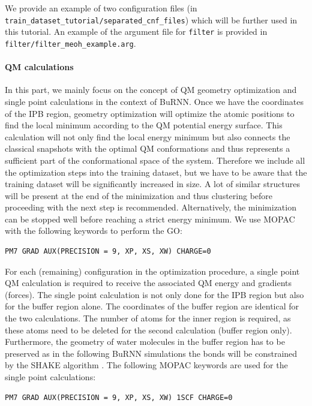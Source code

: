 We provide an example of two configuration files (in \texttt{train\_dataset\_tutorial/separated\_cnf\_files}) which will be further used in this tutorial. An example of the argument file for \texttt{filter} is provided in \texttt{filter/filter\_meoh\_example.arg}.

\paragraph{QM calculations}
In this part, we mainly focus on the concept of QM geometry optimization and single point calculations in the context of BuRNN. Once we have the coordinates of the IPB region, geometry optimization will optimize the atomic positions to find the local minimum according to the QM potential energy surface. This calculation will not only find the local energy minimum but also connects the classical snapshots with the optimal QM conformations and thus represents a sufficient part of the conformational space of the system. Therefore we include all the optimization steps into the training dataset, but we have to be aware that the training dataset will be significantly increased in size. A lot of similar structures will be present at the end of the minimization and thus clustering before proceeding with the next step is recommended. Alternatively, the minimization can be stopped well before reaching a strict energy minimum. We use MOPAC with the following keywords to perform the GO:

\begin{lstlisting}[breaklines=true, breakatwhitespace=false]
PM7 GRAD AUX(PRECISION = 9, XP, XS, XW) CHARGE=0
\end{lstlisting}

For each (remaining) configuration in the optimization procedure, a single point QM calculation is required to receive the associated QM energy and gradients (forces). The single point calculation is not only done for the IPB region but also for the buffer region alone. The coordinates of the buffer region are identical for the two calculations. The number of atoms for the inner region is required, as these atoms need to be deleted for the second calculation (buffer region only). Furthermore, the geometry of water molecules in the buffer region has to be preserved as in the following BuRNN simulations the bonds will be constrained by the SHAKE algorithm \cite{RYCKAERT1977SHAKE}. The following MOPAC keywords are used for the single point calculations:

\begin{lstlisting}[breaklines=true, breakatwhitespace=false]
PM7 GRAD AUX(PRECISION = 9, XP, XS, XW) 1SCF CHARGE=0
\end{lstlisting}


